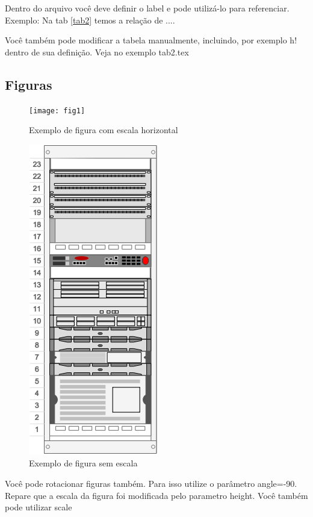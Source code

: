 \documentclass[	DIV=calc,%
							paper=a4,%
							fontsize=12pt,%
							onecolumn]{scrartcl}	 					%
\begin{document}


Dentro do arquivo você deve definir o label e pode utilizá-lo para referenciar. Exemplo:
Na tab \ref{tab2} temos a relação de ....


Você também pode modificar a tabela manualmente, incluindo, por exemplo h! dentro de sua definição. Veja no exemplo tab2.tex

\subsection{Figuras}



\begin{figure}
\centering
\texttt{[image: fig1]}
\caption{Exemplo de figura com escala horizontal}
\label{fig1}
\end{figure}


\begin{figure}
	\centering
	\includegraphics[]{fig2}
	\caption{Exemplo de figura sem escala}
	\label{fig2}
\end{figure}

Você pode rotacionar figuras também. Para isso utilize o parâmetro angle=-90. Repare que a escala da figura foi modificada pelo parametro height. Você também pode utilizar scale
\end{document}
